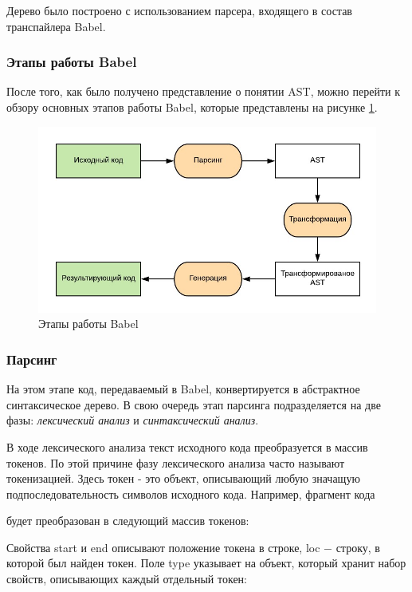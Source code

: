 \documentclass[14pt, a4paper]{article}
\begin{document}


Дерево было построено с использованием парсера, входящего в состав транспайлера Babel.

\subsubsection{Этапы работы Babel}

После того, как было получено представление о понятии AST, можно перейти к обзору основных этапов 
работы Babel, которые представлены на рисунке \ref{babel_stages}.
\begin{figure}[h!]
  \centering
  \includegraphics[scale=1.2]{img/babel_stages.jpg}
  \caption{Этапы работы Babel}
  \label{babel_stages}
\end{figure}

\subsubsection*{Парсинг}
На этом этапе код, передаваемый в Babel, конвертируется в абстрактное синтаксическое дерево. 
В свою очередь этап парсинга подразделяется на 
две фазы: \textit{лексический анализ} и \textit{синтаксический анализ}.

В ходе лексического анализа текст исходного кода преобразуется в массив токенов. По этой причине фазу 
лексического анализа часто называют токенизацией. Здесь токен - это объект, описывающий любую значащую 
подпоследовательность символов исходного кода. Например, фрагмент кода


будет преобразован в следующий массив токенов:


Свойства start и end описывают положение токена в строке, loc $-$ строку, в которой был найден токен. 
Поле type указывает на объект, который хранит набор свойств, описывающих каждый отдельный токен:

\end{document}
